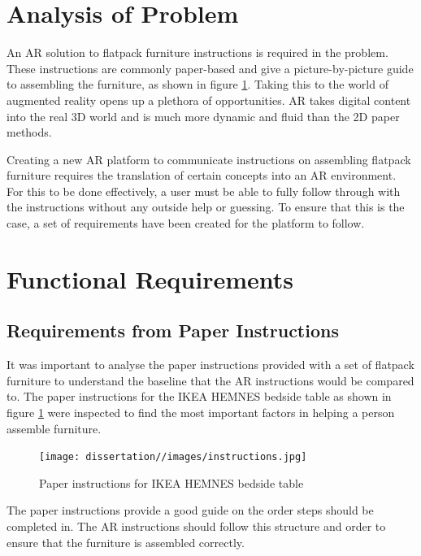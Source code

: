 \documentclass{l4proj}
\begin{document}
\section{Analysis of Problem}

An AR solution to flatpack furniture instructions is required in the problem. These instructions are commonly paper-based and give a picture-by-picture guide to assembling the furniture, as shown in figure \ref{fig:instructions}. Taking this to the world of augmented reality opens up a plethora of opportunities. AR takes digital content into the real 3D world and is much more dynamic and fluid than the 2D paper methods.

Creating a new AR platform to communicate instructions on assembling flatpack furniture requires the translation of certain concepts into an AR environment. For this to be done effectively, a user must be able to fully follow through with the instructions without any outside help or guessing. To ensure that this is the case, a set of requirements have been created for the platform to follow.

\section{Functional Requirements}

\subsection{Requirements from Paper Instructions}

It was important to analyse the paper instructions provided with a set of flatpack furniture to understand the baseline that the AR instructions would be compared to. The paper instructions for the IKEA HEMNES bedside table \citep{noauthor_hemnes_nodate} as shown in figure \ref{fig:instructions} were inspected to find the most important factors in helping a person assemble furniture.

\begin{figure}[hbt!]
    \centering
    \texttt{[image: dissertation//images/instructions.jpg]}
    \caption{Paper instructions for IKEA HEMNES bedside table \citep{noauthor_hemnes_nodate}}
    \label{fig:instructions}
\end{figure}

The paper instructions provide a good guide on the order steps should be completed in. The AR instructions should follow this structure and order to ensure that the furniture is assembled correctly.
\end{document}
